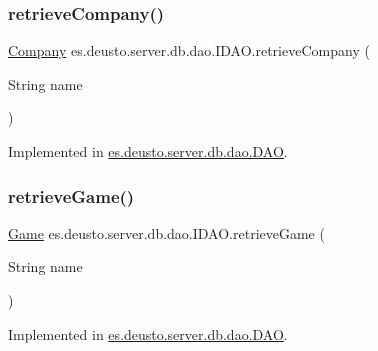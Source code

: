 \subsubsection{\texorpdfstring{retrieve\+Company()}{retrieveCompany()}}
{\footnotesize\ttfamily \hyperlink{classes_1_1deusto_1_1server_1_1db_1_1data_1_1_company}{Company} es.\+deusto.\+server.\+db.\+dao.\+I\+D\+A\+O.\+retrieve\+Company (\begin{DoxyParamCaption}\item[{String}]{name }\end{DoxyParamCaption})}



Implemented in \hyperlink{classes_1_1deusto_1_1server_1_1db_1_1dao_1_1_d_a_o_aabd374b169473cfd6e1bdc4efc89b177}{es.\+deusto.\+server.\+db.\+dao.\+D\+AO}.

\mbox{\label{interfacees_1_1deusto_1_1server_1_1db_1_1dao_1_1_i_d_a_o_a30558c19c086ac0ffff6796a8ae208fb}} 
\subsubsection{\texorpdfstring{retrieve\+Game()}{retrieveGame()}}
{\footnotesize\ttfamily \hyperlink{classes_1_1deusto_1_1server_1_1db_1_1data_1_1_game}{Game} es.\+deusto.\+server.\+db.\+dao.\+I\+D\+A\+O.\+retrieve\+Game (\begin{DoxyParamCaption}\item[{String}]{name }\end{DoxyParamCaption})}



Implemented in \hyperlink{classes_1_1deusto_1_1server_1_1db_1_1dao_1_1_d_a_o_ac94a91d3e5aeeb98fc12f087532b3506}{es.\+deusto.\+server.\+db.\+dao.\+D\+AO}.

\mbox{\label{interfacees_1_1deusto_1_1server_1_1db_1_1dao_1_1_i_d_a_o_a8b15955637f9b81c57900761c6d03571}} 

